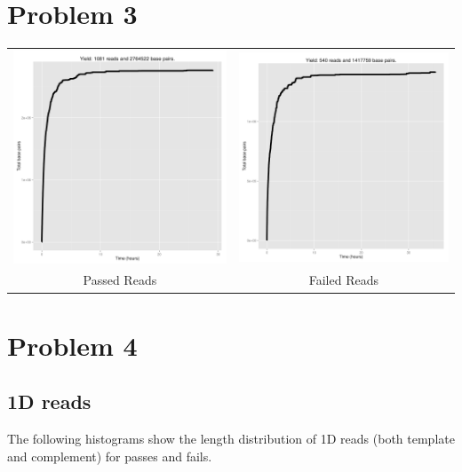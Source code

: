 \documentclass[11pt]{article}
\begin{document}
\section*{Problem 3}
\begin{tabular}{cc}
\includegraphics[width=.48\textwidth]{cumnucpass}
&
\includegraphics[width=.48\textwidth]{cumnucfail}
\\
Passed Reads
&
Failed Reads
\end{tabular}
\section*{Problem 4}
\subsection*{1D reads}

        The following histograms show the length distribution of 1D reads (both template and complement) for passes and fails.
\end{document}

